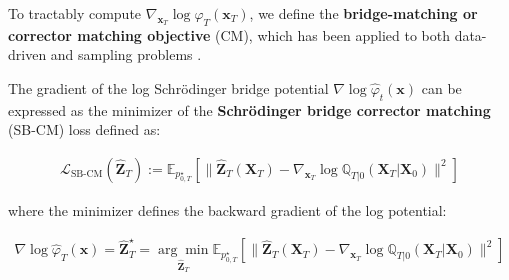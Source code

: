\documentclass{article}
\newcommand{\boldtext}[1]{\textbf{\textcolor{MyGreen}{#1}}}
\begin{document}
To tractably compute $\nabla_{\boldsymbol{x}_T}\log \hat{\varphi}_T(\boldsymbol{x}_T)$, we define the \boldtext{bridge-matching or corrector matching objective} (CM), which has been applied to both data-driven \citep{shi2023diffusion, liu20232} and sampling problems \citep{liu2025adjoint}.

\begin{proposition}\label{prop:sb-correction-match}
    The gradient of the log Schrödinger bridge potential $\nabla \log \hat{\varphi}_t(\boldsymbol{x})$ can be expressed as the minimizer of the \textbf{Schrödinger bridge corrector matching} (SB-CM) loss defined as:
    \begin{small}
    \begin{align}
        \mathcal{L}_{\text{SB-CM}}(\widehat{\boldsymbol{Z}}_T):=\mathbb{E}_{p^\star_{0,T}}\left[\|\widehat{\boldsymbol{Z}}_T(\boldsymbol{X}_T)-\nabla_{\boldsymbol{x}_T}\log \mathbb{Q}_{T|0}(\boldsymbol{X}_T|\boldsymbol{X}_0)\|^2\right]\tag{Corrector Matching Objective}\label{eq:corrector-matching-objective}
    \end{align}
    \end{small}
    where the minimizer defines the backward gradient of the log potential:
    \begin{small}
    \begin{align}
        \nabla \log \hat{\varphi}_T(\boldsymbol{x})=\widehat{\boldsymbol{Z}}^\star_T=\underset{\widehat{\boldsymbol{Z}}_T}{\arg\min}\mathbb{E}_{ p^\star_{0,T}}\left[\|\widehat{\boldsymbol{Z}}_T(\boldsymbol{X}_T)-\nabla_{\boldsymbol{x}_T}\log \mathbb{Q}_{T|0}(\boldsymbol{X}_T|\boldsymbol{X}_0)\|^2\right]
    \end{align}
    \end{small}
\end{proposition}
\end{document}
